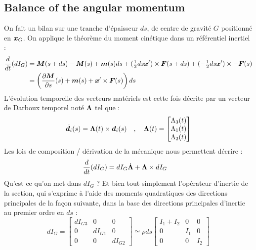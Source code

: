 \subsection{Balance of the angular momentum}
On fait un bilan sur une tranche d'épaisseur $ds$, de centre de gravité $G$ positionné en $\boldsymbol{x}_G$. On applique le théorème du moment cinétique dans un référentiel inertiel :
\begin{equation}
	\begin{aligned}
		\frac{d}{dt}(dI_G) &=
		\boldsymbol{M}(s+ds)-\boldsymbol{M}(s) + \boldsymbol{m}(s)ds
		+ (\tfrac{1}{2}ds\boldsymbol{x}')\times \boldsymbol{F}(s+ds) + (-\tfrac{1}{2}ds\boldsymbol{x}')\times -\boldsymbol{F}(s)\\
		&= \left(\frac{\partial \boldsymbol{M}}{\partial s}(s)+\boldsymbol{m}(s) + \boldsymbol{x}'\times \boldsymbol{F}(s)\right)ds
	\end{aligned}
\end{equation}
L'évolution temporelle des vecteurs matériels est cette fois décrite par un vecteur de Darboux temporel noté $\boldsymbol{\Lambda}$ tel que :
\begin{equation}
	\dot{\boldsymbol{d}_{i}}(s) =\boldsymbol{\Lambda}(t) \times \boldsymbol{d}_i(s)	\quad,\quad
	\boldsymbol{\Lambda}(t)
	=
	\begin{bmatrix}
		\Lambda_3(t) \\
		\Lambda_1(t) \\
		\Lambda_2(t)
	\end{bmatrix}
\end{equation}
Les lois de composition / dérivation de la mécanique nous permettent décrire :
\begin{equation}
	\begin{aligned}
		\frac{d}{dt}(dI_G) &= dI_G\dot{\boldsymbol{\Lambda}} + \boldsymbol{\Lambda}\times dI_G
	\end{aligned}
\end{equation}
Qu'est ce qu'on met dans $dI_G$ ? Et bien tout simplement l'opérateur d'inertie de la section, qui s'exprime à l'aide des moments quadratiques des directions principales de la façon suivante, dans la base des directions principales d'inertie au premier ordre en $ds$ :
\begin{equation}
	dI_G =
	 \begin{bmatrix}
			dI_{G3} & 0 & 0 \\
			0 & dI_{G1} & 0 \\
			0 & 0 & dI_{G2}
	\end{bmatrix}
	\simeq \rho ds
		\begin{bmatrix}
			I_1 + I_2 & 0 & 0 \\
			0 & I_1 & 0 \\
			0 & 0 & I_2
		\end{bmatrix}
\end{equation}
